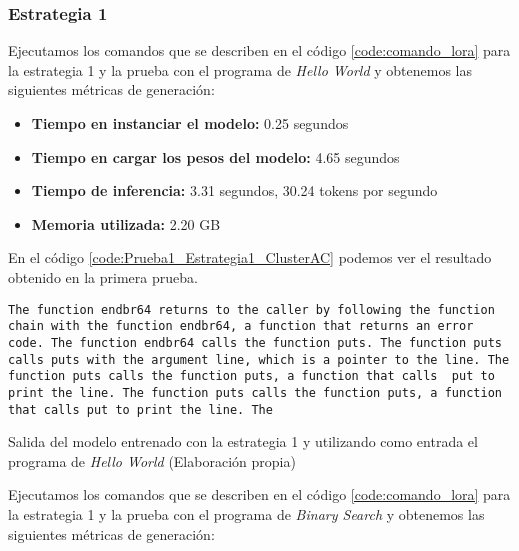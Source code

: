 \subsubsection{Estrategia 1}
\label{subsubsec:resultados:estrategia_1}


Ejecutamos los comandos que se describen en el código \ref{code:comando_lora} para
la estrategia 1 y la prueba con el programa de \textit{Hello World} y obtenemos
las siguientes métricas de generación:

\begin{itemize}
    \item \textbf{Tiempo en instanciar el modelo:} 0.25 segundos
    \item \textbf{Tiempo en cargar los pesos del modelo:} 4.65 segundos
    \item \textbf{Tiempo de inferencia:} 3.31 segundos, 30.24 tokens por segundo
    \item \textbf{Memoria utilizada:} 2.20 GB
\end{itemize}

En el código \ref{code:Prueba1_Estrategia1_ClusterAC} podemos ver el resultado obtenido
en la primera prueba.

\begin{mycode}
    \begin{verbatim}
The function endbr64 returns to the caller by following the function chain with the function endbr64, a function that returns an error code. The function endbr64 calls the function puts. The function puts calls puts with the argument line, which is a pointer to the line. The function puts calls the function puts, a function that calls  put to print the line. The function puts calls the function puts, a function that calls put to print the line. The
    \end{verbatim}
    \caption[Salida del modelo entrenado con la estrategia 1 y utilizando como entrada el programa de \textit{Hello World}]{Salida del modelo entrenado con la estrategia 1 y utilizando como entrada el programa de \textit{Hello World} (Elaboración propia)}
    \label{code:Prueba1_Estrategia1_ClusterAC}
\end{mycode}

Ejecutamos los comandos que se describen en el código \ref{code:comando_lora} para
la estrategia 1 y la prueba con el programa de \textit{Binary Search} y obtenemos
las siguientes métricas de generación:


